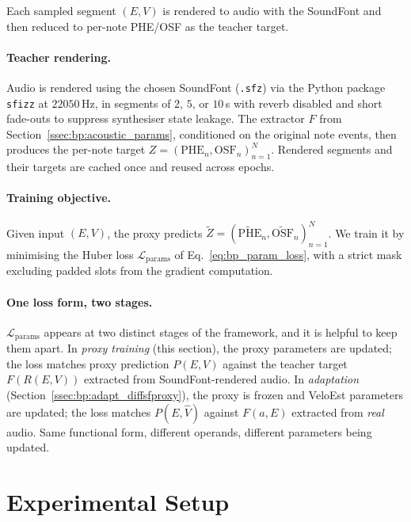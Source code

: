 Each sampled segment $(E, V)$ is rendered to audio with the SoundFont and then reduced to per-note PHE/OSF as the teacher target.

\paragraph{Teacher rendering.}
Audio is rendered using the chosen SoundFont (\texttt{.sfz}) via the Python package \texttt{sfizz} at $22050$\,Hz, in segments of $2$, $5$, or $10$\,s with reverb disabled and short fade-outs to suppress synthesiser state leakage. The extractor $F$ from Section~\ref{ssec:bp:acoustic_params}, conditioned on the original note events, then produces the per-note target $Z = (\mathrm{PHE}_n, \mathrm{OSF}_n)_{n=1}^{N}$. Rendered segments and their targets are cached once and reused across epochs.

\paragraph{Training objective.}
Given input $(E, V)$, the proxy predicts $\widetilde{Z} = (\widetilde{\mathrm{PHE}}_n, \widetilde{\mathrm{OSF}}_n)_{n=1}^{N}$. We train it by minimising the Huber loss $\mathcal{L}_{\mathrm{params}}$ of Eq.~\eqref{eq:bp_param_loss}, with a strict mask excluding padded slots from the gradient computation.

\paragraph{One loss form, two stages.}
$\mathcal{L}_{\mathrm{params}}$ appears at two distinct stages of the framework, and it is helpful to keep them apart. In \emph{proxy training} (this section), the proxy parameters are updated; the loss matches proxy prediction $P(E, V)$ against the teacher target $F(R(E, V))$ extracted from SoundFont-rendered audio. In \emph{adaptation} (Section~\ref{ssec:bp:adapt_diffsfproxy}), the proxy is frozen and VeloEst parameters are updated; the loss matches $P(E, \hat{V})$ against $F(a, E)$ extracted from \emph{real} audio. Same functional form, different operands, different parameters being updated.

\section{Experimental Setup}
\label{sec:bp:experiments}

